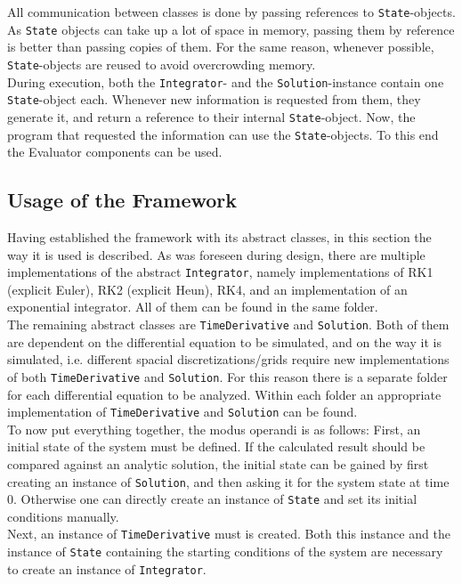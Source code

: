 All communication between classes is done by passing references to \texttt{State}-objects.
As \texttt{State} objects can take up a lot of space in memory, passing them by reference is better than passing copies of them.
For the same reason, whenever possible, \texttt{State}-objects are reused to avoid overcrowding memory.
\\
During execution, both the \texttt{Integrator}- and the \texttt{Solution}-instance contain one \texttt{State}-object each.
Whenever new information is requested from them, they generate it, and return a reference to their internal \texttt{State}-object.
Now, the program that requested the information can use the \texttt{State}-objects.
To this end the Evaluator components can be used.

\subsection{Usage of the Framework}
Having established the framework with its abstract classes, in this section the way it is used is described.
As was foreseen during design, there are multiple implementations of the abstract \texttt{Integrator}, namely implementations of RK1 (explicit Euler), RK2 (explicit Heun), RK4, and an implementation of an exponential integrator.
All of them can be found in the same folder.
\\
The remaining abstract classes are \texttt{TimeDerivative} and \texttt{Solution}.
Both of them are dependent on the differential equation to be simulated, and on the way it is simulated, i.e. different spacial discretizations/grids require new implementations of both \texttt{TimeDerivative} and \texttt{Solution}.
For this reason there is a separate folder for each differential equation to be analyzed.
Within each folder an appropriate implementation of \texttt{TimeDerivative} and \texttt{Solution} can be found.
\\
To now put everything together, the modus operandi is as follows:
First, an initial state of the system must be defined.
If the calculated result should be compared against an analytic solution, the initial state can be gained by first creating an instance of \texttt{Solution}, and then asking it for the system state at time $0$.
Otherwise one can directly create an instance of \texttt{State} and set its initial conditions manually.
\\
Next, an instance of \texttt{TimeDerivative} must is created.
Both this instance and the instance of \texttt{State} containing the starting conditions of the system are necessary to create an instance of \texttt{Integrator}.

